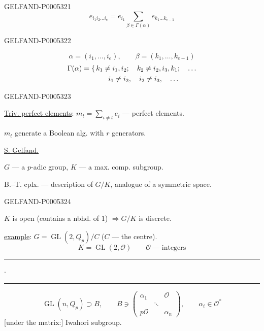 \begin{GelfandAdjacentEvidence}{GELFAND-P000532}{1}
\[
e_{i_1i_2\ldots i_e}=e_{i_1}\sum_{\beta\in\Gamma(\alpha)}e_{k_1\ldots k_{e-1}}
\]
\end{GelfandAdjacentEvidence}
\begin{GelfandAdjacentEvidence}{GELFAND-P000532}{2}

\[
\alpha=(i_1,\ldots,i_e),\qquad \beta=(k_1,\ldots,k_{e-1})
\]
\[
\begin{aligned}
\Gamma(\alpha)&=\{\,k_1\ne i_1,i_2;\quad k_2\ne i_2,i_3,k_1;\quad\ldots\\
&\hphantom{=\{\,}\qquad i_1\ne i_2,\quad i_2\ne i_3,\quad\ldots
\end{aligned}
\]
\end{GelfandAdjacentEvidence}
\begin{GelfandAdjacentEvidence}{GELFAND-P000532}{3}


\noindent\makebox[.77\linewidth]{\dotfill}\par

\uline{Triv. perfect elements}: \(m_t=\sum_{i\ne t}e_i\) — perfect elements.

$m_t$ generate a Boolean alg. with $r$ generators.

\uline{S. Gelfand.}


$G$ — a $p$-adic group, $K$ — a max. comp. subgroup.

B.–T. cplx. — description of $G/K$, analogue of a symmetric space.
\end{GelfandAdjacentEvidence}
\begin{GelfandAdjacentEvidence}{GELFAND-P000532}{4}


$K$ is open (contains a nbhd. of $1$) $\Rightarrow G/K$ is discrete.

\uline{example}: $G=\operatorname{GL}(2,Q_p)/C$ ($C$ — the centre).
\[
K=\operatorname{GL}(2,\mathcal O)\qquad \mathcal O\ \text{— integers}
\]

\hfill\rule{.8cm}{.35pt}\enspace\(\cdot\)\enspace\rule{1.1cm}{.35pt}\par

\[
\operatorname{GL}(n,Q_p)\supset B,\qquad
B\ni
\begin{pmatrix}
\alpha_1&&\mathcal O\\
&\ddots&\\
p\mathcal O&&\alpha_n
\end{pmatrix},
\qquad \alpha_i\in\mathcal O^*
\]
[under the matrix:] Iwahori subgroup.
\end{GelfandAdjacentEvidence}
